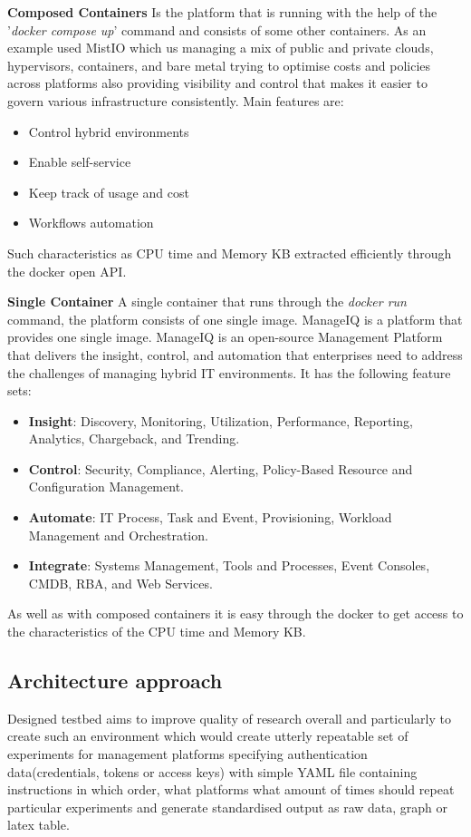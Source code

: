 \textbf{Composed Containers}
Is the platform that is running with the help of the '\textit{docker compose up}' command and consists of some other containers. As an example used MistIO\cite{mistio} which us managing a mix of public and private clouds, hypervisors, containers, and bare metal trying to optimise costs and policies across platforms also providing visibility and control that makes it easier to govern various infrastructure consistently. Main features are:
\begin{itemize}
    \item Control hybrid environments
    \item Enable self-service
    \item Keep track of usage and cost
    \item Workflows automation
\end{itemize}
Such characteristics as CPU time and Memory KB extracted efficiently through the docker open API.

\textbf{Single Container}
A single container that runs through the \textit{docker run} command, the platform consists of one single image. ManageIQ\cite{manageiq} is a platform that provides one single image. ManageIQ is an open-source Management Platform that delivers the insight, control, and automation that enterprises need to address the challenges of managing hybrid IT environments. It has the following feature sets:
\begin{itemize}
    \item \textbf{Insight}: Discovery, Monitoring, Utilization, Performance, Reporting, Analytics, Chargeback, and Trending.
    \item \textbf{Control}: Security, Compliance, Alerting, Policy-Based Resource and Configuration Management.
    \item \textbf{Automate}: IT Process, Task and Event, Provisioning, Workload Management and Orchestration.
    \item \textbf{Integrate}: Systems Management, Tools and Processes, Event Consoles, CMDB, RBA, and Web Services.
\end{itemize}
As well as with composed containers it is easy through the docker to get access to the characteristics of the CPU time and Memory KB.
\subsection{Architecture approach}
Designed testbed aims to improve quality of research overall and particularly to create such an environment which would create utterly repeatable set of experiments for management platforms specifying  authentication data(credentials, tokens or access keys) with simple YAML file containing instructions in which order, what platforms what amount of times should repeat particular experiments and generate standardised output as raw data, graph or latex table. 

